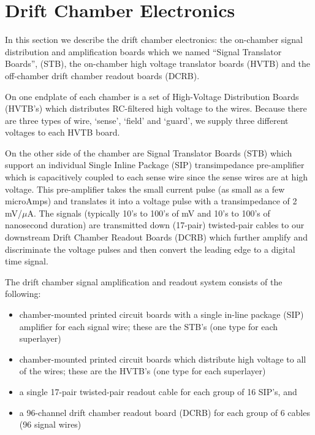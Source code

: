 \section{Drift Chamber Electronics}
In this section we describe the drift chamber electronics:
the on-chamber signal distribution and amplification boards which
we named ``Signal Translator Boards'', (STB),
the on-chamber high voltage translator boards (HVTB) and the
off-chamber drift chamber readout boards (DCRB).

On one endplate of each chamber is a set of High-Voltage Distribution Boards (HVTB's)
which distributes RC-filtered high voltage to the wires.  Because there are three
types of wire, `sense', `field' and `guard', we supply three different voltages
to each HVTB board.  

On the other side of the chamber are Signal Translator Boards (STB) 
which support an individual Single Inline Package (SIP) transimpedance
pre-amplifier which is capacitively coupled to each sense wire since the
sense wires are at high voltage.  This pre-amplifier takes the
small current pulse (as small as a few microAmps) and translates it into a voltage 
pulse with a transimpedance of 2 mV/$\mu$A.  The signals (typically
10's to 100's of mV and 10's to 100's of nanosecond duration) are
transmitted down (17-pair) twisted-pair cables to our downstream
Drift Chamber Readout Boards (DCRB) which further amplify and
discriminate the voltage pulses and then convert the leading edge
to a digital time signal.


The drift chamber signal amplification and readout system consists of the 
following:
\begin{itemize}
\item  chamber-mounted printed circuit boards with a single in-line package
(SIP) amplifier for each signal wire; these are the STB's (one type for each superlayer)
\item  chamber-mounted printed circuit boards which distribute high voltage
to all of the wires; these are the HVTB's (one type for each superlayer)
\item a single 17-pair twisted-pair readout cable for each group of 16
SIP's, and
\item a 96-channel drift chamber readout board (DCRB) for each group
of 6 cables (96 signal wires)
\end{itemize}


